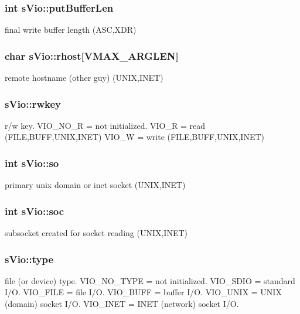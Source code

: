\subsubsection[{putBufferLen}]{\setlength{\rightskip}{0pt plus 5cm}int {\bf sVio::putBufferLen}}\label{a00002_ad68b54648906734b80b93205cfb22812}
final write buffer length (ASC,XDR) 
\subsubsection[{rhost}]{\setlength{\rightskip}{0pt plus 5cm}char {\bf sVio::rhost}[VMAX\_\-ARGLEN]}\label{a00002_af3eaf81b391a451956735215da0f6b55}
remote hostname (other guy) (UNIX,INET) 
\subsubsection[{rwkey}]{ {\bf sVio::rwkey}}\label{a00002_a46b6d2de5b885ef6850e74dbf69230c5}
r/w key. VIO\_\-NO\_\-R = not initialized. VIO\_\-R = read (FILE,BUFF,UNIX,INET) VIO\_\-W = write (FILE,BUFF,UNIX,INET) 
\subsubsection[{so}]{\setlength{\rightskip}{0pt plus 5cm}int {\bf sVio::so}}\label{a00002_af100e7b153d174650215657e74e0360f}
primary unix domain or inet socket (UNIX,INET) 
\subsubsection[{soc}]{\setlength{\rightskip}{0pt plus 5cm}int {\bf sVio::soc}}\label{a00002_a846bff280f1fad2f64708f80dd824d72}
subsocket created for socket reading (UNIX,INET) 
\subsubsection[{type}]{ {\bf sVio::type}}\label{a00002_a10ff01c784656edf59de7290943d2bb8}
file (or device) type. VIO\_\-NO\_\-TYPE = not initialized. VIO\_\-SDIO = standard I/O. VIO\_\-FILE = file I/O. VIO\_\-BUFF = buffer I/O. VIO\_\-UNIX = UNIX (domain) socket I/O. VIO\_\-INET = INET (network) socket I/O. 
